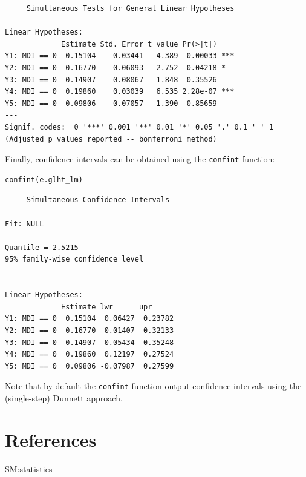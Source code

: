 \documentclass{article}
\begin{document}
\begin{verbatim}
	 Simultaneous Tests for General Linear Hypotheses

Linear Hypotheses:
             Estimate Std. Error t value Pr(>|t|)    
Y1: MDI == 0  0.15104    0.03441   4.389  0.00033 ***
Y2: MDI == 0  0.16770    0.06093   2.752  0.04218 *  
Y3: MDI == 0  0.14907    0.08067   1.848  0.35526    
Y4: MDI == 0  0.19860    0.03039   6.535 2.28e-07 ***
Y5: MDI == 0  0.09806    0.07057   1.390  0.85659    
---
Signif. codes:  0 '***' 0.001 '**' 0.01 '*' 0.05 '.' 0.1 ' ' 1
(Adjusted p values reported -- bonferroni method)
\end{verbatim}

Finally, confidence intervals can be obtained using the \texttt{confint}
function:
\lstset{language=r,label= ,caption= ,captionpos=b,numbers=none}
\begin{lstlisting}
confint(e.glht_lm)
\end{lstlisting}

\begin{verbatim}
	 Simultaneous Confidence Intervals

Fit: NULL

Quantile = 2.5215
95% family-wise confidence level
 

Linear Hypotheses:
             Estimate lwr      upr     
Y1: MDI == 0  0.15104  0.06427  0.23782
Y2: MDI == 0  0.16770  0.01407  0.32133
Y3: MDI == 0  0.14907 -0.05434  0.35248
Y4: MDI == 0  0.19860  0.12197  0.27524
Y5: MDI == 0  0.09806 -0.07987  0.27599
\end{verbatim}
Note that by default the \texttt{confint} function output confidence
intervals using the (single-step) Dunnett approach.


\clearpage

\section{References}
\label{sec:org6a582b5}

\begingroup
\renewcommand{\section}[2]{}

 
\endgroup

\clearpage

\appendix

\section{Statistics: definitions and notations}
\label{SM:statistics}
\end{document}
